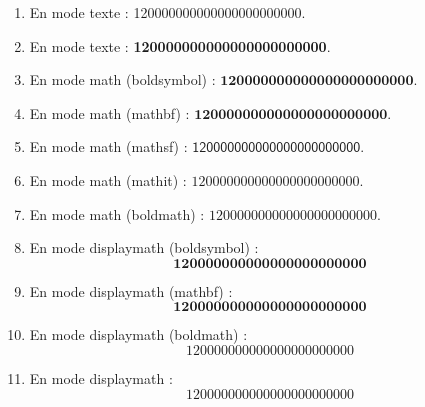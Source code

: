 \documentclass[a4paper,10pt]{article}
\begin{document}
\begin{enumerate}
\item En mode texte : \num[obeyall]{120000000000000000000000}.
\item En mode texte : \textbf{\num[obeyall]{120000000000000000000000}}.
\item En mode math (boldsymbol) : $\boldsymbol{\num[obeyall]{120000000000000000000000}}$.
\item En mode math (mathbf) : $\mathbf{\num[obeyall]{120000000000000000000000}}$.
\item En mode math (mathsf) : $\mathsf{\num[obeyall]{120000000000000000000000}}$.
\item En mode math (mathit) : $\mathit{\num[obeyall]{120000000000000000000000}}$.
\item En mode math (boldmath) : {\boldmath$\num[obeyall]{120000000000000000000000}$}.
\item En mode displaymath (boldsymbol) :
\[\boldsymbol{\num[obeyall]{120000000000000000000000}}\]
\item En mode displaymath (mathbf) :
\[\mathbf{\num[obeyall]{120000000000000000000000}}\]
\item En mode displaymath (boldmath) :
{\boldmath\[\num[obeyall]{120000000000000000000000}\]}
\item En mode displaymath :
\[\num[obeyall]{120000000000000000000000}\]
\end{enumerate}
\end{document}
